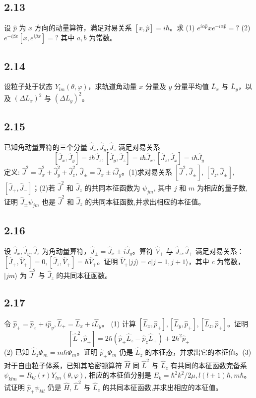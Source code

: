 \subsection{2.13}
设 $\hat{p}$ 为 $x$ 方向的动量算符，满足对易关系 $[x, \hat{p}] = i\hbar$。求 (1) $e^{i\alpha \hat{p}} x e^{-i\alpha \hat{p}} = ?$ (2) $e^{-i\beta x} [x, e^{i\beta x}] = ?$ 其中 $a, b$ 为常数。

\subsection{2.14}
设粒子处于状态 $Y_{lm}(\theta, \varphi)$，求轨道角动量 $x$ 分量及 $y$ 分量平均值 $\bar{L}_x$ 与 $\bar{L}_y$，以及 $(\Delta L_x)^2$ 与 $(\Delta L_y)^2$。

\subsection{2.15}
已知角动量算符的三个分量 $\hat{J}_x, \hat{J}_y, \hat{J}_z$ 满足对易关系 
$$[\hat{J}_x, \hat{J}_y] = i\hbar \hat{J}_z, [\hat{J}_y, \hat{J}_z] = i\hbar \hat{J}_x, [\hat{J}_z, \hat{J}_x] = i\hbar \hat{J}_y$$
定义: $\hat{J}^2 = \hat{J}_x^2 + \hat{J}_y^2 + \hat{J}_z^2$, $\hat{J}_{\pm} = \hat{J}_x \pm i \hat{J}_y$。(1)求对易关系 $[\hat{J}^2, \hat{J}_{\pm}]$, $[\hat{J}_z, \hat{J}_{\pm}]$, $[\hat{J}_+, \hat{J}_-]$；(2)若 $\hat{J}^2$ 和 $\hat{J}_z$ 的共同本征函数为 $\psi_{jm}$, 其中 $j$ 和 $m$ 为相应的量子数, 证明 $\hat{J}_{\pm} \psi_{jm}$ 也是 $\hat{J}^2$ 和 $\hat{J}_z$ 的共同本征函数,并求出相应的本征值。

\subsection{2.16}
设 $\hat{J}_x, \hat{J}_y, \hat{J}_z$ 为角动量算符，$\hat{J}_{\pm} = \hat{J}_x \pm i\hat{J}_y$。算符 $\hat{V}_+$ 与 $\hat{J}_z, \hat{J}_+$ 满足对易关系：$[\hat{J}_+, \hat{V}_+] = 0, [\hat{J}_z, \hat{V}_+] = \hbar \hat{V}_+$。证明 $\hat{V}_+ | j j \rangle = c | j + 1, j + 1 \rangle$，其中 $c$ 为常数，$|jm\rangle$ 为 $\hat{J}^2$ 与 $\hat{J}_z$ 的共同本征函数。

\subsection{2.17}
令 $\hat{p}_+ = \hat{p}_x + i \hat{p}_y, \hat{L}_+ = \hat{L}_x + i \hat{L}_y$。
(1) 计算 $[\hat{L}_x, \hat{p}_+], [\hat{L}_y, \hat{p}_+], [\hat{L}_z, \hat{p}_+]$。证明
$$[\hat{L}^2, \hat{p}_+] = 2 \hbar (\hat{p}_+ \hat{L}_z - \hat{p}_z \hat{L}_+ ) + 2 \hbar^2 \hat{p}_+$$
(2) 已知 $\hat{L}_z \Phi_m = m \hbar \Phi_m$。证明 $\hat{p}_+ \Phi_m$ 仍是 $\hat{L}_z$ 的本征态，并求出它的本征值。(3) 对于自由粒子体系，已知其哈密顿算符 $\hat{H}$ 同 $\hat{L}^2$ 与 $\hat{L}_z$ 有共同的本征函数完备系 $\psi_{klm} = R_{kl}(r) Y_{lm}(\theta, \varphi)$, 相应的本征值分别是 $E_k = \hbar^2 k^2 / 2\mu, l(l+1)\hbar, m\hbar$。试证明 $\hat{p}_+ \psi_{kll}$ 仍是 $\hat{H}$, $\hat{L}^2$ 与 $\hat{L}_z$ 的共同本征函数,并求出相应的本征值。

